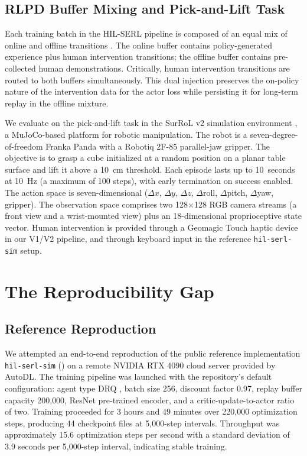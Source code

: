 \documentclass[12pt,a4paper]{article}
\begin{document}
\subsection{RLPD Buffer Mixing and Pick-and-Lift Task}

Each training batch in the HIL-SERL pipeline is composed of an equal mix of online and offline transitions \citep{ball2023efficient}. The online buffer contains policy-generated experience plus human intervention transitions; the offline buffer contains pre-collected human demonstrations. Critically, human intervention transitions are routed to both buffers simultaneously. This dual injection preserves the on-policy nature of the intervention data for the actor loss while persisting it for long-term replay in the offline mixture.

We evaluate on the pick-and-lift task in the SurRoL v2 simulation environment \citep{xu2021surrol}, a MuJoCo-based platform for robotic manipulation. The robot is a seven-degree-of-freedom Franka Panda with a Robotiq 2F-85 parallel-jaw gripper. The objective is to grasp a cube initialized at a random position on a planar table surface and lift it above a 10~cm threshold. Each episode lasts up to 10~seconds at 10~Hz (a maximum of 100 steps), with early termination on success enabled. The action space is seven-dimensional ($\Delta x$, $\Delta y$, $\Delta z$, $\Delta$roll, $\Delta$pitch, $\Delta$yaw, gripper). The observation space comprises two 128$\times$128 RGB camera streams (a front view and a wrist-mounted view) plus an 18-dimensional proprioceptive state vector. Human intervention is provided through a Geomagic Touch haptic device in our V1/V2 pipeline, and through keyboard input in the reference \texttt{hil-serl-sim} setup.

\section{The Reproducibility Gap} \label{sec:gap}

\subsection{Reference Reproduction}

We attempted an end-to-end reproduction of the public reference implementation \texttt{hil-serl-sim} (\citealp{wang2024hilserlsim}) on a remote NVIDIA RTX 4090 cloud server provided by AutoDL. The training pipeline was launched with the repository's default configuration: agent type DRQ \citep{yarats2021mastering}, batch size 256, discount factor 0.97, replay buffer capacity 200{,}000, ResNet pre-trained encoder, and a critic-update-to-actor ratio of two. Training proceeded for 3 hours and 49 minutes over 220{,}000 optimization steps, producing 44 checkpoint files at 5{,}000-step intervals. Throughput was approximately 15.6 optimization steps per second with a standard deviation of 3.9 seconds per 5{,}000-step interval, indicating stable training.
\end{document}
